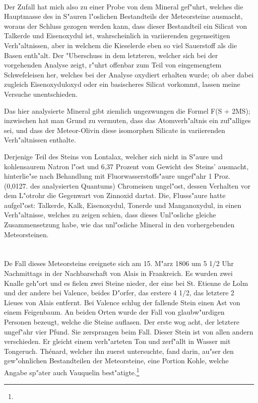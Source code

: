 \documentclass[a4paper, 11pt, oneside]{article}
\begin{document}
\paragraph{}
Der Zufall hat mich also zu einer Probe von dem Mineral gef"uhrt, welches die Hauptmasse des in S"auren l"oslichen Bestandteils der Meteorsteine ausmacht, woraus der Schluss gezogen werden kann, dass dieser Bestandteil ein Silicat von Talkerde und Eisenoxydul ist, wahrscheinlich in variierenden gegenseitigen Verh"altnissen, aber in welchem die Kieselerde eben so viel Sauerstoff als die Basen enth"alt. Der "Uberschuss in dem letzteren, welcher sich bei der vorgehenden Analyse zeigt, r"uhrt offenbar zum Teil von eingemengtem Schwefeleisen her, welches bei der Analyse oxydiert erhalten wurde; ob aber dabei zugleich Eisenoxyduloxyd oder ein basischeres Silicat vorkommt, lassen meine Versuche unentschieden.

Das hier analysierte Mineral gibt ziemlich ungezwungen die Formel F(S + 2MS); inzwischen hat man Grund zu vermuten, dass das Atomverh"altnis ein zuf"alliges sei, und dass der Meteor-Olivin diese isomorphen Silicate in variierenden Verh"altnissen enthalte.

Derjenige Teil des Steins von Lontalax, welcher sich nicht in S"aure und kohlensaurem Natron l"ost und 6,37 Prozent vom Gewicht des Steins’ ausmacht, hinterlie"se nach Behandlung mit Fluorwasserstoffs"aure ungef"ahr 1 Proz. (0,0127. des analysierten Quantums) Chromeisen ungel"ost, dessen Verhalten vor dem L"otrohr die Gegenwart von Zinnoxid dartat. Die, Flusss"aure hatte aufgel"ost: Talkerde, Kalk, Eisenoxydul, Tonerde und Manganoxydul, in einen Verh"altnisse, welches zu zeigen schien, dass dieses Unl"osliche gleiche Zusammensetzung habe, wie das unl"osliche Mineral in den vorhergebenden Meteorsteinen.

\section{}
\paragraph{}
De Fall dieses Meteorsteins ereignete sich am 15. M"arz 1806 um 5 1/2 Uhr Nachmittags in der Nachbarschaft von Alais in Frankreich. Es wurden zwei Knalle geh"ort und es fielen zwei Steine nieder, der eine bei St. Etienne de Lolm und der andere bei Valence, beides D"orfer, das erstere 4 1/2, das letztere 2 Lieues von Alais entfernt. Bei Valence schlug der fallende Stein einen Ast von einem Feigenbaum. An beiden Orten wurde der Fall von glaubw"urdigen Personen bezeugt, welche die Steine auflasen. Der erste wog acht, der letztere ungef"ahr vier Pfund. Sie zersprangen beim Fall. Dieser Stein ist von allen andern verschieden. Er gleicht einem verh"arteten Ton und zerf"allt in Wasser mit Tongeruch. Thénard, welcher ihn zuerst untersuchte, fand darin, au"ser den gew"ohnlichen Bestandteilen der Meteorsteine, eine Portion Kohle, welche Angabe sp"ater auch Vauquelin best"atigte.\footnote{}
\end{document}
